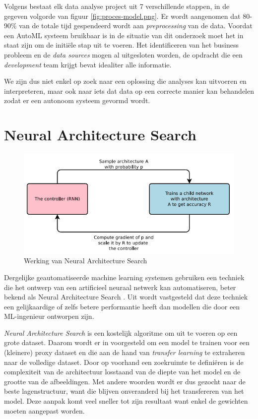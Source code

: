 Volgens \textcite{Lemahieu2018} bestaat elk data analyse project uit 7 verschillende stappen, in de gegeven volgorde van figuur \ref{fig:proces-model.png}. Er wordt aangenomen dat 80-90\% van de totale tijd gespendeerd wordt aan \textit{preprocessing} van de data. Voordat een AutoML systeem bruikbaar is in de situatie van dit onderzoek moet het in staat zijn om de initiële stap uit te voeren. Het identificeren van het business probleem en de \textit{data sources} mogen al uitgesloten worden, de opdracht die een \textit{development} team krijgt bevat idealiter alle informatie. 

We zijn dus niet enkel op zoek naar een oplossing die analyses kan uitvoeren en interpreteren, maar ook naar iets dat data op een correcte manier kan behandelen zodat er een autonoom systeem gevormd wordt. 

\section{Neural Architecture Search}
\label{sec:nas}

\begin{figure}
    \includegraphics[width=\linewidth]{img/nas.png}
    \caption{Werking van Neural Architecture Search \autocite{ZophL2016}}
    \label{fig:nas-bp}
\end{figure}

Dergelijke geautomatiseerde machine learning systemen gebruiken een techniek die het ontwerp van een artificieel neuraal netwerk kan automatiseren, beter bekend als Neural Architecture Search \autocite{Elsken2019}. Uit \textcite{ZophL2016} wordt vastgesteld dat deze techniek een gelijkaardige of zelfs betere performantie heeft dan modellen die door een ML-ingenieur ontworpen zijn.

\textit{Neural Architecture Search} is een kostelijk algoritme om uit te voeren op een grote dataset. Daarom wordt er in \textcite{Zoph2017} voorgesteld om een model te trainen voor een (kleinere) proxy dataset en die aan de hand van \textit{transfer learning} te extraheren naar de volledige dataset. Door op voorhand een zoekruimte te definiëren is de complexiteit van de architectuur losstaand van de diepte van het model en de grootte van de afbeeldingen. Met andere woorden wordt er dus gezocht naar de beste lagenstructuur, want die blijven onveranderd bij het transfereren van het model. Deze aanpak komt veel sneller tot zijn resultaat want enkel de gewichten moeten aangepast worden.


